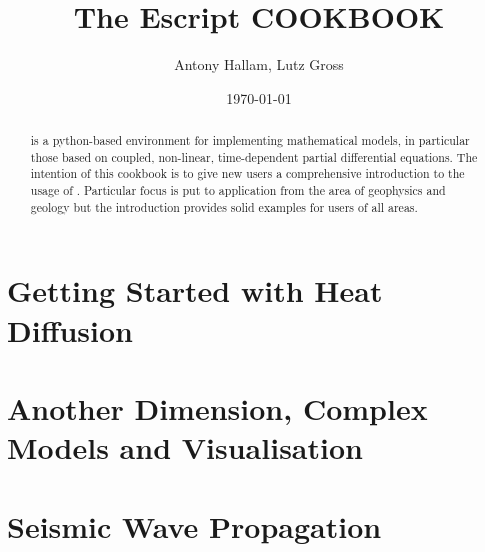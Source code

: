 \documentclass{manual}
\title{The Escript COOKBOOK}
\author{Antony Hallam, Lutz Gross}
\date{\today}
\begin{document}
\maketitle



\begin{abstract}
\esc is a python-based environment for implementing mathematical models, in particular those based on coupled, non-linear, time-dependent partial differential equations. The intention of this cookbook is to give new \esc users a comprehensive introduction to the usage of \esc. Particular focus is put to application from the 
area of geophysics and geology but the introduction provides solid examples for users of all areas.  
\end{abstract}
\tableofcontents

\newpage




\chapter{Getting Started with Heat Diffusion}
\label{CHAP HEAT DIFF}



\chapter{Another Dimension, Complex Models and Visualisation}
\label{CHAP HEAT 2}



\chapter{Seismic Wave Propagation}

\end{document}
